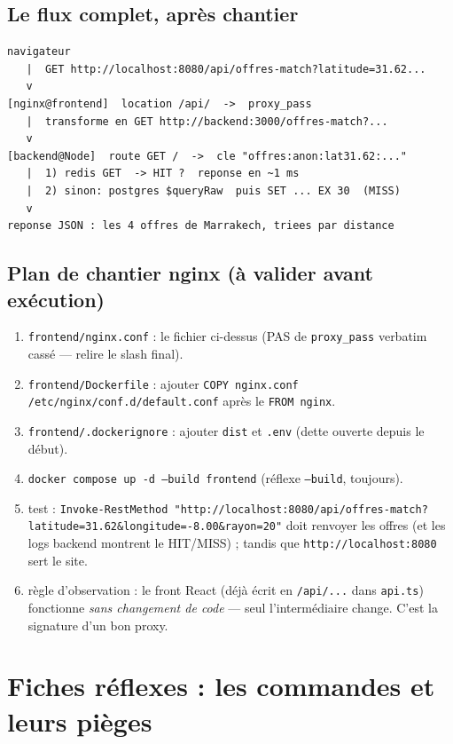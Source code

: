 \documentclass[11pt,a4paper]{article}
\begin{document}
\subsection{Le flux complet, après chantier}

\begin{verbatim}
navigateur
   |  GET http://localhost:8080/api/offres-match?latitude=31.62...
   v
[nginx@frontend]  location /api/  ->  proxy_pass
   |  transforme en GET http://backend:3000/offres-match?...
   v
[backend@Node]  route GET /  ->  cle "offres:anon:lat31.62:..."
   |  1) redis GET  -> HIT ?  reponse en ~1 ms
   |  2) sinon: postgres $queryRaw  puis SET ... EX 30  (MISS)
   v
reponse JSON : les 4 offres de Marrakech, triees par distance
\end{verbatim}

\subsection{Plan de chantier nginx (à valider avant exécution)}

\begin{enumerate}[nosep]
  \item \texttt{frontend/nginx.conf} : le fichier ci-dessus (PAS de
        \texttt{proxy\_pass} verbatim cassé --- relire le slash final).
  \item \texttt{frontend/Dockerfile} : ajouter
        \texttt{COPY nginx.conf /etc/nginx/conf.d/default.conf} après le
        \texttt{FROM nginx}.
  \item \texttt{frontend/.dockerignore} : ajouter \texttt{dist} et
        \texttt{.env} (dette ouverte depuis le début).
  \item \texttt{docker compose up -d --build frontend} (réflexe
        \texttt{--build}, toujours).
  \item test : \texttt{Invoke-RestMethod
        "http://localhost:8080/api/offres-match?latitude=31.62\&longitude=-8.00\&rayon=20"}
        doit renvoyer les offres (et les logs backend montrent le HIT/MISS) ;
        tandis que \texttt{http://localhost:8080} sert le site.
  \item règle d'observation : le front React (déjà écrit en \texttt{/api/...}
        dans \texttt{api.ts}) fonctionne \emph{sans changement de code} ---
        seul l'intermédiaire change. C'est la signature d'un bon proxy.
\end{enumerate}

\section{Fiches réflexes : les commandes et leurs pièges}
\end{document}
